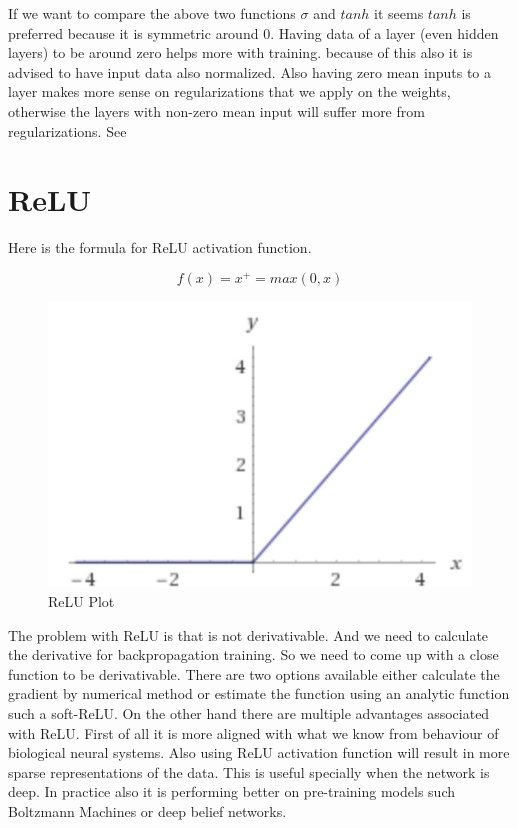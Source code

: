 \documentclass[a4paper, 11pt, fleqn]{article}
\begin{document}
If we want to compare the above two functions $\sigma$ and $tanh$ it seems $tanh$ is preferred because it is symmetric around 0. Having data of a layer (even hidden layers) to be around zero helps more with training. because of this  also it is advised to have input data also normalized. Also having  zero mean inputs to a layer makes more sense on regularizations that we apply on the weights, otherwise the layers with non-zero mean input will suffer more from regularizations. See \cite{LeCun:1998:EB:645754.668382}
\section{ReLU}
Here is the formula for ReLU activation function. 

\begin{equation}
    f(x) = x^{+} = max(0, x)
\end{equation}

\begin{figure}[!htb]
    \centering
    \includegraphics[scale=0.3]{images/ReLU.jpg}
    \caption{ReLU Plot}
\end{figure}

The problem with ReLU is that is not derivativable. And we need to calculate the derivative for backpropagation training. So we need to come up with a close function to be derivativable. There are two options available either calculate the gradient by numerical method or estimate the function using an analytic function such a soft-ReLU. 
On the other hand there are multiple advantages associated with ReLU.  First of all it is more aligned with what we know from behaviour of biological neural systems. Also using ReLU activation function will result in  more sparse representations of the data. This is useful specially when the network is deep. In practice also it is performing better on pre-training models such Boltzmann Machines or deep belief networks. 
\end{document}
